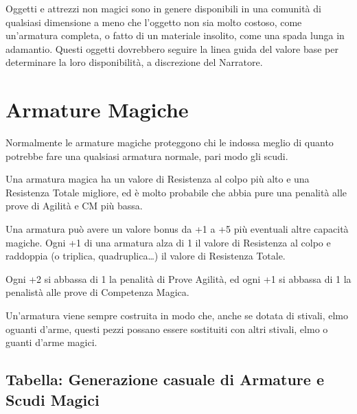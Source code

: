 \documentclass[a4paper,11pt,twoside,openany]{book}
\begin{document}
Oggetti e attrezzi non magici sono in genere disponibili in una comunità di qualsiasi dimensione a meno che l'oggetto non sia molto costoso, come un'armatura completa, o fatto di un materiale insolito, come una spada lunga in adamantio. Questi oggetti dovrebbero seguire la linea guida del valore base per determinare la loro disponibilità, a discrezione del Narratore.

\pagebreak

\section{Armature Magiche}

\label{armature-magiche}

Normalmente le armature magiche proteggono chi le indossa meglio di quanto potrebbe fare una qualsiasi armatura normale, pari modo gli scudi.

Una armatura magica ha un valore di Resistenza al colpo più alto e una Resistenza Totale migliore, ed è molto probabile che abbia pure una penalità alle prove di Agilità e CM più bassa.

Una armatura può avere un valore bonus da +1 a +5 più eventuali altre capacità magiche. Ogni +1 di una armatura alza di 1 il valore di Resistenza al colpo e raddoppia (o triplica, quadruplica\ldots ) il valore di Resistenza Totale.

Ogni +2 si abbassa di 1 la penalità di Prove Agilità, ed ogni +1 si abbassa di 1 la penalistà alle prove di Competenza Magica.

Un'armatura viene sempre costruita in modo che, anche se dotata di stivali, elmo oguanti d'arme, questi pezzi possano essere sostituiti con altri stivali, elmo o guanti d'arme magici.


\subsection{Tabella: Generazione casuale di Armature e Scudi Magici}

\label{tabella-generazione-casuale-di-armature-e-scudi-magici}
\end{document}
